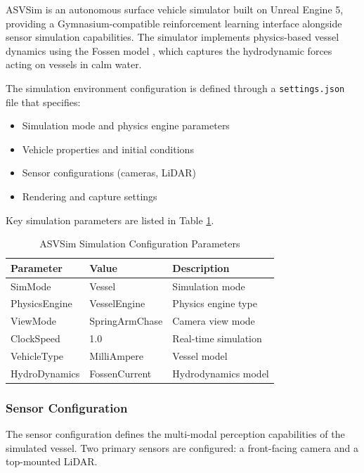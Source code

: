 ASVSim \parencite{schroeder2020asvsim} is an autonomous surface vehicle simulator built on Unreal Engine 5, providing a Gymnasium-compatible reinforcement learning interface alongside sensor simulation capabilities. The simulator implements physics-based vessel dynamics using the Fossen model \parencite{fossen2011handbook}, which captures the hydrodynamic forces acting on vessels in calm water.

The simulation environment configuration is defined through a \texttt{settings.json} file that specifies:

\begin{itemize}
    \item Simulation mode and physics engine parameters
    \item Vehicle properties and initial conditions
    \item Sensor configurations (cameras, LiDAR)
    \item Rendering and capture settings
\end{itemize}

Key simulation parameters are listed in Table \ref{tab:simulation_params}.

\begin{table}[htbp]
\centering
\caption{ASVSim Simulation Configuration Parameters}
\label{tab:simulation_params}
\begin{tabular}{@{}lll@{}}
\toprule
\textbf{Parameter} & \textbf{Value} & \textbf{Description} \\
\midrule
SimMode & Vessel & Simulation mode \\
PhysicsEngine & VesselEngine & Physics engine type \\
ViewMode & SpringArmChase & Camera view mode \\
ClockSpeed & 1.0 & Real-time simulation \\
VehicleType & MilliAmpere & Vessel model \\
HydroDynamics & FossenCurrent & Hydrodynamics model \\
\bottomrule
\end{tabular}
\end{table}

\subsubsection{Sensor Configuration}

The sensor configuration defines the multi-modal perception capabilities of the simulated vessel. Two primary sensors are configured: a front-facing camera and a top-mounted LiDAR.

